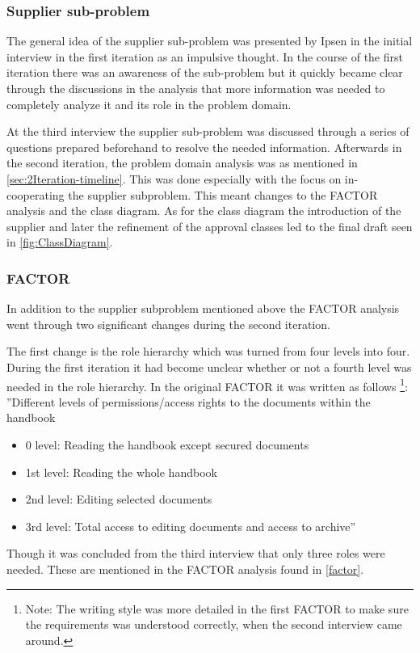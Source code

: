 \subsubsection*{Supplier sub-problem} 
The general idea of the supplier sub-problem was presented by Ipsen in the initial interview in the first iteration as an impulsive thought.
In the course of the first iteration there was an awareness of the sub-problem but it quickly became clear through the discussions in the analysis that more information was needed to completely analyze it and its role in the problem domain.

At the third interview the supplier sub-problem was discussed through a series of questions prepared beforehand to resolve the needed information.
Afterwards in the second iteration, the problem domain analysis was as mentioned in \cref{sec:2Iteration-timeline}. 
This was done especially with the focus on in-cooperating the supplier subproblem.
This meant changes to the FACTOR analysis and the class diagram.
As for the class diagram the introduction of the supplier and later the refinement of the approval classes led to the final draft seen in \cref{fig:ClassDiagram}.

\subsubsection*{FACTOR}
In addition to the supplier subproblem mentioned above the FACTOR analysis went through two significant changes during the second iteration.

The first change is the role hierarchy which was turned from four levels into four.
During the first iteration it had become unclear whether or not a fourth level was needed in the role hierarchy.
In the original FACTOR it was written as follows
\footnote{Note: The writing style was more detailed in the first FACTOR to make sure the requirements was understood correctly, when the second interview came around.}:
\newline
''Different levels of permissions/access rights to the documents within the handbook
\begin{itemize}
	\item 
	0 level:
	Reading the handbook except secured documents
	\item 
	1st level:
	Reading the whole handbook
	\item 
	2nd level:
	Editing selected documents
	\item 
	3rd level:
	Total access to editing documents and access to archive''
\end{itemize}
Though it was concluded from the third interview that only three roles were needed.
These are mentioned in the FACTOR analysis found in \cref{factor}.

